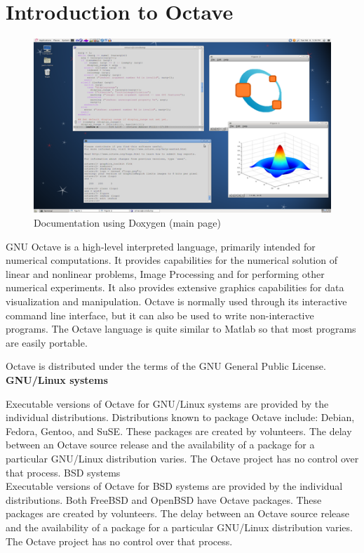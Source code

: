
\section{ Introduction to Octave}
\begin{figure}[ht]
	\centering \includegraphics[scale=.50]{input/images/O1.png}
	\caption{Documentation using Doxygen (main page)}
\end{figure}

 GNU Octave is a high-level interpreted language, primarily intended for numerical computations. It provides capabilities for the numerical solution of linear and nonlinear problems, Image Processing and for performing other numerical experiments. It also provides extensive graphics capabilities for data visualization and manipulation. Octave is normally used through its interactive command line interface, but it can also be used to write non-interactive programs. The Octave language is quite similar to Matlab so that most programs are easily portable.

 Octave is distributed under the terms of the GNU General Public License.\\ 
 
 \textbf{GNU/Linux systems}
 
 Executable versions of Octave for GNU/Linux systems are provided by the individual distributions. Distributions known to package Octave include: Debian, Fedora, Gentoo, and SuSE. These packages are created by volunteers. The delay between an Octave source release and the availability of a package for a particular GNU/Linux distribution varies. The Octave project has no control over that process. 
 BSD systems\\
 
 Executable versions of Octave for BSD systems are provided by the individual distributions. Both FreeBSD and OpenBSD have Octave packages. These packages are created by volunteers. The delay between an Octave source release and the availability of a package for a particular GNU/Linux distribution varies. The Octave project has no control over that process.\\
 
